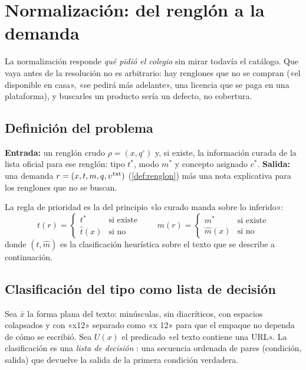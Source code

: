 \section{Normalización: del renglón a la demanda}
\label{sec:normalizacion}

La normalización responde \emph{qué pidió el colegio} sin mirar todavía el
catálogo. Que vaya antes de la resolución no es arbitrario: hay renglones que
no se compran («el disponible en casa», «se pedirá más adelante», una licencia
que se paga en una plataforma), y buscarles un producto sería un defecto, no
cobertura.

\subsection{Definición del problema}

\begin{definicion}[Normalización]
\textbf{Entrada:} un renglón crudo $\rho=(x,q^\circ)$ y, si existe, la
información curada de la lista oficial para ese renglón: tipo $t^\ast$, modo
$m^\ast$ y concepto asignado $c^\ast$.
\textbf{Salida:} una demanda $r=(x,t,m,q,\upsilon^{\mathrm{txt}})$
(\cref{def:renglon}) más una nota explicativa para los renglones que no se
buscan.
\end{definicion}

La regla de prioridad es la del principio «lo curado manda sobre lo inferido»:
\[
  t(r) = \begin{cases} t^\ast & \text{si existe}\\ \hat t(x) & \text{si no}\end{cases}
  \qquad
  m(r) = \begin{cases} m^\ast & \text{si existe}\\ \hat m(x) & \text{si no}\end{cases}
\]
donde $(\hat t,\hat m)$ es la clasificación heurística sobre el texto que se
describe a continuación.

\subsection{Clasificación del tipo como lista de decisión}

Sea $\bar x$ la forma plana del texto: minúsculas, sin diacríticos, con
espacios colapsados y con «x12» separado como «x 12» para que el empaque no
dependa de cómo se escribió. Sea $U(x)$ el predicado «el texto contiene una
URL». La clasificación es una \emph{lista de decisión}
\cite{rivest1987decision}: una secuencia ordenada de pares
(condición, salida) que devuelve la salida de la primera condición
verdadera.

